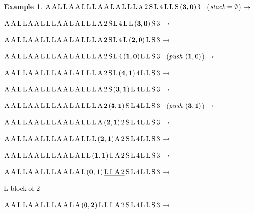\documentclass{article}
\theoremstyle{plain}
\theoremstyle{definition}
\newtheorem{Exa}[The]{Example}
\begin{document}
{\begin{Exa}
\smallskip

 ${\rm A \, A \, L \, L \, A \, A \, L \, L \, L \, A \, A \, L \, A \, L \, L \, L \, A \, 2 \, S \, L \, 4 \, L \, L \, S \, {\bf (3,0)} \, 3}$~
(${\it stack} = \emptyset$) $\rightarrow$

 ${\rm A \, A \, L \, L \, A \, A \, L \, L \, L \, A \, A \, L \, A \, L \, L \, L \, A \, 2 \, S \, L \, 4 \, L \, L \, {\bf (3,0)} \, S \, 3}$ $\rightarrow$

 ${\rm A \, A \, L \, L \, A \, A \, L \, L \, L \, A \, A \, L \, A \, L \, L \, L \, A \, 2 \, S \, L \, 4 \, L \, {\bf (2,0)} \, L \, S \, 3}$ $\rightarrow$

 ${\rm A \, A \, L \, L \, A \, A \, L \, L \, L \, A \, A \, L \, A \, L \, L \,  L \, A \,  2 \, S \, L \, 4 \, {\bf (1,0)} \, L \, L \, S \, 3}$ ~(${\it push~} {\bf (1,0)}$) $\rightarrow$

 ${\rm A \, A \, L \, L \, A \, A \, L \, L \, L \, A \, A \, L \, A \, L \, L \,  L \, A \,  2 \, S \, L \, {\bf (4,1)} \, 4 \, L \, L \, S \, 3}$ $\rightarrow$

 ${\rm A \, A \, L \, L \, A \, A \, L \, L \, L \, A \, A \, L \, A \, L \, L \,  L \, A \,  2 \, S \, {\bf (3,1)} \, L \, 4 \, L \, L \, S \, 3}$ $\rightarrow$

 ${\rm A \, A \, L \, L \, A \, A \, L \, L \, L \, A \, A \, L \, A \, L \, L \,  L \, A \,  2 \, {\bf (3,1)} \, S \, L \, 4 \, L \, L \, S \, 3}$ ~(${\it push~} {\bf (3,1)}$) $\rightarrow$

 ${\rm A \, A \, L \, L \, A \, A \, L \, L \, L \, A \, A \, L \, A \, L \, L \,  L \, A \,  {\bf (2,1)} \, 2 \, S \, L \, 4 \, L \, L \, S \, 3}$ $\rightarrow$

 ${\rm A \, A \, L \, L \, A \, A \, L \, L \, L \, A \, A \, L \, A \, L \, L \,  L \, {\bf (2,1)} \, A \, 2 \, S \, L \, 4 \, L \, L \, S \, 3}$ $\rightarrow$

 ${\rm A \, A \, L \, L \, A \, A \, L \, L \, L \, A \, A \, L \, A \, L \, L \,  {\bf (1,1)} \, L \, A \, 2 \, S \, L \, 4 \, L \, L \, S \, 3}$ $\rightarrow$

 ${\rm A \, A \, L \, L \, A \, A \, L \, L \, L \, A \, A \, L \, A \, L \, {\bf (0,1)} \, \underline{\rule[-0.1em]{0em}{1em} L \,  L \, A \, 2} \, S \, L \, 4 \, L \, L \, S \, 3}$ $\rightarrow$

 \hspace{4.6cm} {\rm L}-block of $2$

 ${\rm A \, A \, L \, L \, A \, A \, L \, L \, L \, A \, A \, L \, A \, {\bf (0,2)} \, L \, L \,  L \, A \, 2 \, S \, L \, 4 \, L \, L \, S \, 3}$ $\rightarrow$


\end{Exa}}
\end{document}
